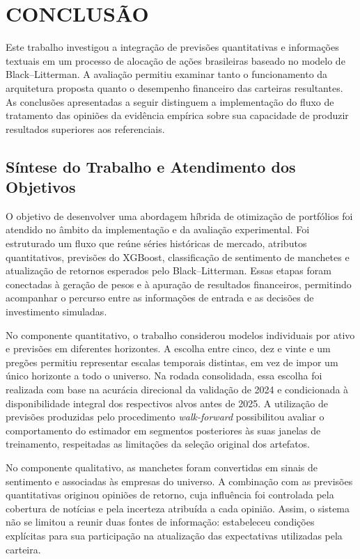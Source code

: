 \chapter{CONCLUSÃO}
\label{cap:conclusao}

Este trabalho investigou a integração de previsões quantitativas e informações textuais em um processo de alocação de ações brasileiras baseado no modelo de Black--Litterman. A avaliação permitiu examinar tanto o funcionamento da arquitetura proposta quanto o desempenho financeiro das carteiras resultantes. As conclusões apresentadas a seguir distinguem a implementação do fluxo de tratamento das opiniões da evidência empírica sobre sua capacidade de produzir resultados superiores aos referenciais.

\section{Síntese do Trabalho e Atendimento dos Objetivos}
\label{sec:conclusao_sintese}

O objetivo de desenvolver uma abordagem híbrida de otimização de portfólios foi atendido no âmbito da implementação e da avaliação experimental. Foi estruturado um fluxo que reúne séries históricas de mercado, atributos quantitativos, previsões do XGBoost, classificação de sentimento de manchetes e atualização de retornos esperados pelo Black--Litterman. Essas etapas foram conectadas à geração de pesos e à apuração de resultados financeiros, permitindo acompanhar o percurso entre as informações de entrada e as decisões de investimento simuladas.

No componente quantitativo, o trabalho considerou modelos individuais por ativo e previsões em diferentes horizontes. A escolha entre cinco, dez e vinte e um pregões permitiu representar escalas temporais distintas, em vez de impor um único horizonte a todo o universo. Na rodada consolidada, essa escolha foi realizada com base na acurácia direcional da validação de 2024 e condicionada à disponibilidade integral dos respectivos alvos antes de 2025. A utilização de previsões produzidas pelo procedimento \emph{walk-forward} possibilitou avaliar o comportamento do estimador em segmentos posteriores às suas janelas de treinamento, respeitadas as limitações da seleção original dos artefatos.

No componente qualitativo, as manchetes foram convertidas em sinais de sentimento e associadas às empresas do universo. A combinação com as previsões quantitativas originou opiniões de retorno, cuja influência foi controlada pela cobertura de notícias e pela incerteza atribuída a cada opinião. Assim, o sistema não se limitou a reunir duas fontes de informação: estabeleceu condições explícitas para sua participação na atualização das expectativas utilizadas pela carteira.

